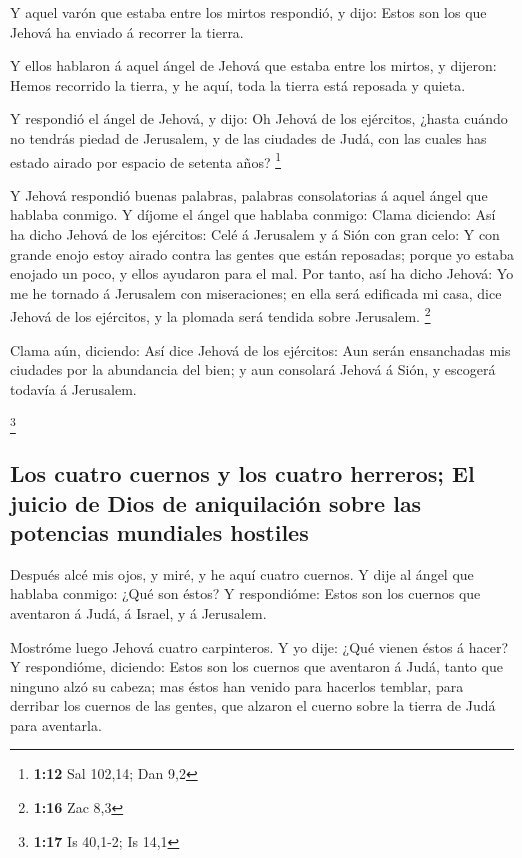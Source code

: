  Y aquel varón que estaba entre los mirtos respondió, y
dijo: Estos son los que Jehová ha enviado á recorrer la tierra.

 Y ellos hablaron á aquel ángel de Jehová que estaba entre
los mirtos, y dijeron: Hemos recorrido la tierra, y he aquí, toda la
tierra está reposada y quieta.

 Y respondió el ángel de Jehová, y dijo: Oh Jehová de los
ejércitos, ¿hasta cuándo no tendrás piedad de Jerusalem, y de las
ciudades de Judá, con las cuales has estado airado por espacio de
setenta años? \footnote{\textbf{1:12} Sal 102,14; Dan 9,2}

 Y Jehová respondió buenas palabras, palabras consolatorias
á aquel ángel que hablaba conmigo.  Y díjome el ángel que
hablaba conmigo: Clama diciendo: Así ha dicho Jehová de los ejércitos:
Celé á Jerusalem y á Sión con gran celo:  Y con grande
enojo estoy airado contra las gentes que están reposadas; porque yo
estaba enojado un poco, y ellos ayudaron para el mal.  Por
tanto, así ha dicho Jehová: Yo me he tornado á Jerusalem con
miseraciones; en ella será edificada mi casa, dice Jehová de los
ejércitos, y la plomada será tendida sobre Jerusalem. \footnote{\textbf{1:16}
  Zac 8,3}

 Clama aún, diciendo: Así dice Jehová de los ejércitos: Aun
serán ensanchadas mis ciudades por la abundancia del bien; y aun
consolará Jehová á Sión, y escogerá todavía á Jerusalem.

\footnote{\textbf{1:17} Is 40,1-2; Is 14,1}

\hypertarget{los-cuatro-cuernos-y-los-cuatro-herreros-el-juicio-de-dios-de-aniquilaciuxf3n-sobre-las-potencias-mundiales-hostiles}{%
\subsection{Los cuatro cuernos y los cuatro herreros; El juicio de Dios
de aniquilación sobre las potencias mundiales
hostiles}\label{los-cuatro-cuernos-y-los-cuatro-herreros-el-juicio-de-dios-de-aniquilaciuxf3n-sobre-las-potencias-mundiales-hostiles}}

 Después alcé mis ojos, y miré, y he aquí cuatro cuernos.
 Y dije al ángel que hablaba conmigo: ¿Qué son éstos? Y
respondióme: Estos son los cuernos que aventaron á Judá, á Israel, y á
Jerusalem.

 Mostróme luego Jehová cuatro carpinteros.  Y
yo dije: ¿Qué vienen éstos á hacer? Y respondióme, diciendo: Estos son
los cuernos que aventaron á Judá, tanto que ninguno alzó su cabeza; mas
éstos han venido para hacerlos temblar, para derribar los cuernos de las
gentes, que alzaron el cuerno sobre la tierra de Judá para aventarla.

